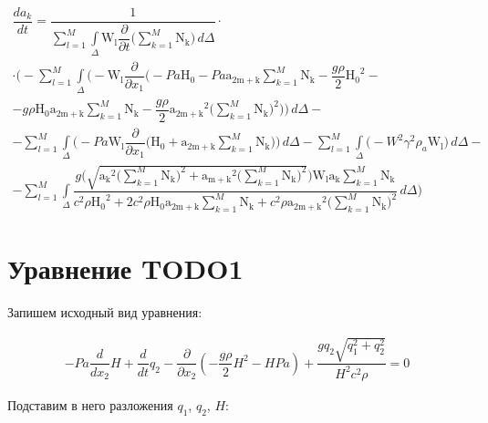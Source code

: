 \documentclass[14pt]{extreport}
\begin{document}
\begin{multline*}
\dfrac{da_{k}}{dt}=\dfrac{1}{\sum\limits_{l=1}^{M} \int\limits_{\Delta} \operatorname{W_{l}} \dfrac{\partial}{\partial t}\bigg(\sum\limits_{k=1}^{M} \operatorname{N_{k}}\bigg)\, d\Delta}\cdot \\ \cdot \bigg(- \sum_{l=1}^{M} \int\limits_{\Delta} \bigg(- \operatorname{W_{l}} \dfrac{\partial}{\partial x_{1}}\bigg(- Pa \operatorname{H_{0}} - Pa \operatorname{a_{2m+k}} \sum_{k=1}^{M} \operatorname{N_{k}} - \dfrac{g \rho}{2} \operatorname{H_{0}}^{2} -\\- g \rho \operatorname{H_{0}} \operatorname{a_{2m+k}} \sum_{k=1}^{M} \operatorname{N_{k}} - \dfrac{g \rho}{2} \operatorname{a_{2m+k}}^{2} \bigg(\sum_{k=1}^{M} \operatorname{N_{k}}\bigg)^{2}\bigg)\bigg)\, d\Delta -\\- \sum_{l=1}^{M} \int\limits_{\Delta} \bigg(- Pa \operatorname{W_{l}} \dfrac{\partial}{\partial x_{1}}\bigg(\operatorname{H_{0}} + \operatorname{a_{2m+k}} \sum_{k=1}^{M} \operatorname{N_{k}}\bigg)\bigg)\, d\Delta - \sum_{l=1}^{M} \int\limits_{\Delta} \bigg(- W^{2} \gamma^{2} \rho_{a} \operatorname{W_{l}}\bigg)\, d\Delta  -\\- \sum_{l=1}^{M} \int\limits_{\Delta} \dfrac{g \bigg(\sqrt{\operatorname{a_{k}}^{2} \bigg(\sum\limits_{k=1}^{M} \operatorname{N_{k}}\bigg)^{2} + \operatorname{a_{m+k}}^{2} \bigg(\sum\limits_{k=1}^{M} \operatorname{N_{k}}\bigg)^{2}}\bigg) \operatorname{W_{l}} \operatorname{a_{k}} \sum\limits_{k=1}^{M} \operatorname{N_{k}}}{c^{2} \rho \operatorname{H_{0}}^{2} + 2 c^{2} \rho \operatorname{H_{0}} \operatorname{a_{2m+k}} \sum\limits_{k=1}^{M} \operatorname{N_{k}} + c^{2} \rho \operatorname{a_{2m+k}}^{2} \bigg(\sum\limits_{k=1}^{M} \operatorname{N_{k}}\bigg)^{2}}\, d\Delta\bigg)
\end{multline*}

\section{Уравнение TODO1}

Запишем исходный вид уравнения:

\begin{multline*}
- Pa \dfrac{d}{d x_{2}} H + \dfrac{d}{d t} q_{2} - \dfrac{\partial}{\partial x_{2}}\left(- \dfrac{g \rho}{2} H^{2} - H Pa\right) + \dfrac{g q_{2} \sqrt{q_{1}^{2} + q_{2}^{2}}}{H^{2} c^{2} \rho} = 0
\end{multline*}


Подставим в него разложения $q_1$, $q_2$, $H$:
\end{document}
